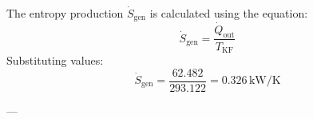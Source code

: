 The entropy production \( \dot{S}_{\text{gen}} \) is calculated using the equation:  
\[
\dot{S}_{\text{gen}} = \frac{\dot{Q}_{\text{out}}}{T_{\text{KF}}}
\]  
Substituting values:  
\[
\dot{S}_{\text{gen}} = \frac{62.482}{293.122} = 0.326 \, \text{kW/K}
\]  

---